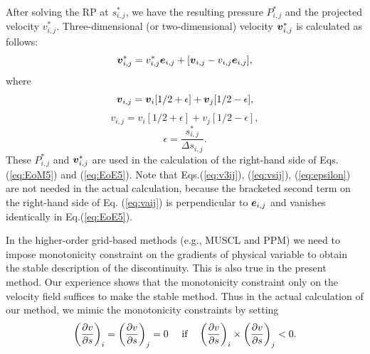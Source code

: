 \documentclass{cjour}
\newcommand{ \Vec   }[1]{ \mbox{\boldmath $ #1 $} }
\newcommand{ \PD    }[2]{ \frac{ \partial #1 }{ \partial #2 } }
\begin{document}
\begin{article}
After solving the RP at $s^*_{i,j}$, we have the resulting pressure 
$P^*_{i,j}$ and the projected velocity $v^*_{i,j}$. 
Three-dimensional (or two-dimensional) velocity 
$\Vec{v}^*_{i,j}$ is calculated as follows: 
\begin{equation}
                \Vec{v}^*_{i,j} = v^*_{i,j} \Vec{e}_{i,j} + 
                          [ \Vec{v}_{i,j} - v_{i,j} \Vec{e}_{i,j} ],  
                                                       \label{eq:vaij}
\end{equation}
where 
\begin{equation}
                \Vec{v}_{i,j} =  \Vec{v}_i [1/2+\epsilon]
                               + \Vec{v}_j [1/2-\epsilon] ,  
                                                       \label{eq:v3ij}
\end{equation}
\begin{equation}
                v_{i,j} =  v_i [1/2+\epsilon] + v_j[1/2-\epsilon] ,  
                                                       \label{eq:vsij}
\end{equation}
\begin{equation}
                 \epsilon = \frac{ s^*_{i,j} }{ \Delta s_{i,j} } . 
                                                     \label{eq:epsilon}
\end{equation}
These $P^*_{i,j}$ and $\Vec{v}^*_{i,j}$ are used in the  
calculation of the right-hand side of Eqs. 
(\ref{eq:EoM5}) and (\ref{eq:EoE5}). 
Note that Eqs.(\ref{eq:v3ij}), (\ref{eq:vsij}), (\ref{eq:epsilon}) 
are not needed in the actual calculation, because 
the bracketed second term on the right-hand side of 
Eq. (\ref{eq:vaij}) is perpendicular to $\Vec{e}_{i,j}$ 
and vanishes identically in Eq.(\ref{eq:EoE5}). 

In the higher-order grid-based methods (e.g., MUSCL and PPM) 
we need to impose monotonicity constraint on the gradients of 
physical variable to obtain the stable description of the 
discontinuity.  
This is also true in the present method. 
Our experience shows that 
the monotonicity constraint only on the velocity field 
suffices to make the stable method. 
Thus in the actual calculation of our method, 
we mimic the monotonicity constraints by setting 
\begin{equation}
                  \left( \PD{v}{s} \right)_{i} =
                  \left( \PD{v}{s} \right)_{j} = 0
                  ~~~~
                  {\rm if}
                  ~~~
                  \left( \PD{v}{s} \right)_{i} \times
                  \left( \PD{v}{s} \right)_{j} < 0 . 
\end{equation}


\end{article}
\end{document}
